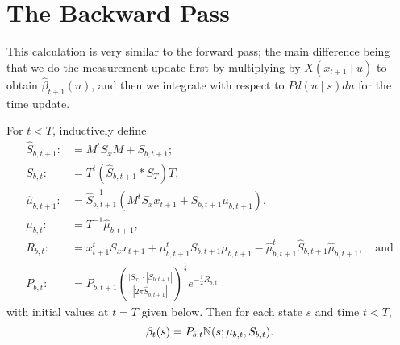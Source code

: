 \documentclass[12pt,leqno]{article}
\begin{document}
\section{The Backward Pass}
This calculation is very similar to the forward pass; the main difference being that we do
the measurement update first by multiplying by $X(x_{t+1}\mid u)$ to obtain $\hat{\beta}_{t+1}(u)$,
and then we integrate with respect to $Pd(u\mid s)du$ for the time update.  

\begin{Thm}\label{beta:1}
  For $t < T$, inductively define
\begin{align*}
  \hat{S}_{b,t+1} :&= M^tS_xM + S_{b,t+1};\\
  S_{b,t} :&= T^t(\hat{S}_{b,t+1}*S_T)T,\\
  \hat{\mu}_{b,t+1} :&= \hat{S}_{b,t+1}^{-1}(M^tS_xx_{t+1} + S_{b,t+1}\mu_{b,t+1}),\\
  \mu_{b,t} :&= T^{-1}\hat{\mu}_{b,t+1},\\
  R_{b,t} :&= x_{t+1}^tS_xx_{t+1} + \mu_{b,t+1}^tS_{b,t+1}\mu_{b,t+1} - \hat{\mu}_{b,t+1}^t\hat{S}_{b,t+1}\hat{\mu}_{b,t+1},\quad\text{and}\\
  P_{b,t} :&= P_{b,t+1}\left(\frac{|S_x|\cdot|S_{b,t+1}|}{|2\pi\hat{S}_{b,t+1}|}\right)^{\frac{1}{2}}e^{-\frac{1}{2}R_{b,t}}
\end{align*}
with initial values at $t = T$ given below. Then for each state $s$ and time $t < T$,
$$
  \beta_t(s) = P_{b,t}{\mathbb N}(s;\mu_{b,t},S_{b,t}).
$$
\end{Thm}
\end{document}
